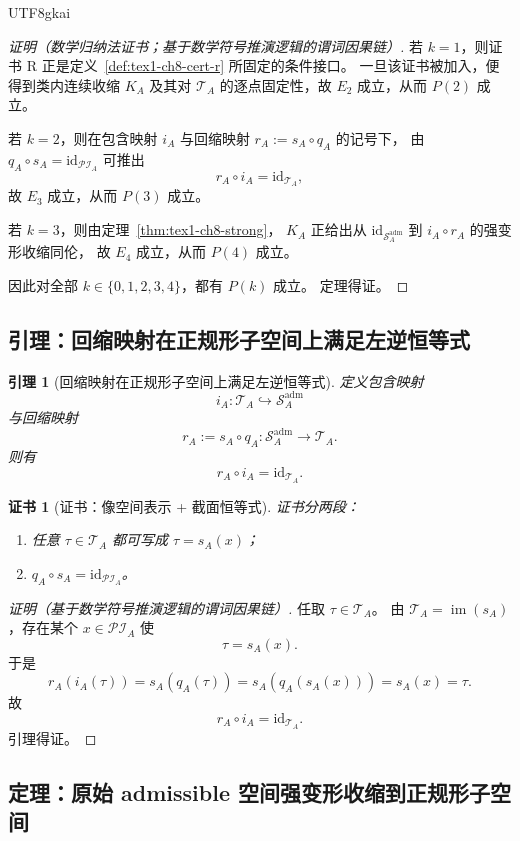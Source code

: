 \documentclass[12pt]{article}
\newtheorem{lemma}{引理}[section]
\newtheorem{Certificate}{证书}[section]
\newcommand{\id}{\mathrm{id}}
\begin{document}
\begin{CJK*}{UTF8}{gkai}
\begin{proof}[证明（数学归纳法证书；基于数学符号推演逻辑的谓词因果链）]
若 \(k=1\)，则证书 R 正是定义~\ref{def:tex1-ch8-cert-r} 所固定的条件接口。
一旦该证书被加入，便得到类内连续收缩 \(K_A\) 及其对 \(\mathcal T_A\) 的逐点固定性，故 \(E_2\) 成立，从而 \(P(2)\) 成立。

若 \(k=2\)，则在包含映射 \(i_A\) 与回缩映射 \(r_A:=s_A\circ q_A\) 的记号下，
由 \(q_A\circ s_A=\id_{\mathcal{PI}_A}\) 可推出
\[
  r_A\circ i_A=\id_{\mathcal T_A},
\]
故 \(E_3\) 成立，从而 \(P(3)\) 成立。

若 \(k=3\)，则由定理~\ref{thm:tex1-ch8-strong}，
\(K_A\) 正给出从 \(\id_{\mathcal S_A^{\mathrm{adm}}}\) 到 \(i_A\circ r_A\) 的强变形收缩同伦，
故 \(E_4\) 成立，从而 \(P(4)\) 成立。

因此对全部 \(k\in\{0,1,2,3,4\}\)，都有 \(P(k)\) 成立。
定理得证。
\end{proof}

\subsection{引理：回缩映射在正规形子空间上满足左逆恒等式}
\label{subsec:tex1-ch8-lemma}

\begin{lemma}[回缩映射在正规形子空间上满足左逆恒等式]
\label{lem:tex1-ch8-retraction}
定义包含映射
\[
  i_A:\mathcal T_A\hookrightarrow \mathcal S_A^{\mathrm{adm}}
\]
与回缩映射
\[
  r_A:=s_A\circ q_A:\mathcal S_A^{\mathrm{adm}}\to \mathcal T_A.
\]
则有
\[
  r_A\circ i_A=\id_{\mathcal T_A}.
\]
\end{lemma}

\begin{Certificate}[证书：像空间表示 + 截面恒等式]
\label{cert:tex1-ch8-retraction}
证书分两段：
\begin{enumerate}
  \item 任意 \(\tau\in \mathcal T_A\) 都可写成 \(\tau=s_A(x)\)；
  \item \(q_A\circ s_A=\id_{\mathcal{PI}_A}\)。
\end{enumerate}
\end{Certificate}

\begin{proof}[证明（基于数学符号推演逻辑的谓词因果链）]
任取 \(\tau\in \mathcal T_A\)。
由 \(\mathcal T_A=\operatorname{im}(s_A)\)，存在某个 \(x\in \mathcal{PI}_A\) 使
\[
  \tau=s_A(x).
\]
于是
\[
  r_A(i_A(\tau))
  =
  s_A(q_A(\tau))
  =
  s_A(q_A(s_A(x)))
  =
  s_A(x)
  =
  \tau.
\]
故
\[
  r_A\circ i_A=\id_{\mathcal T_A}.
\]
引理得证。
\end{proof}

\subsection{定理：原始 admissible 空间强变形收缩到正规形子空间}
\label{subsec:tex1-ch8-theorem}


\end{CJK*}
\end{document}
